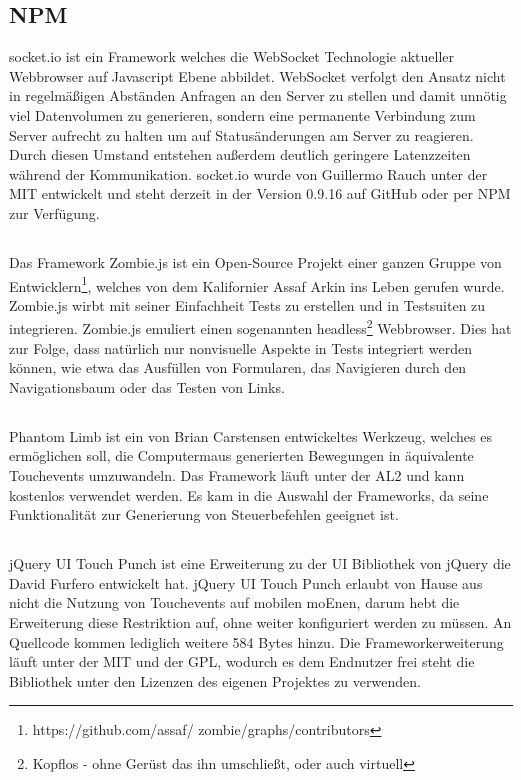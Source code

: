 	\subsection{NPM }
	socket.io ist ein \Gls{Framework} welches die WebSocket Technologie aktueller \Gls{Webbrowser} auf \Gls{Javascript} Ebene abbildet. WebSocket verfolgt den Ansatz nicht in regelmäßigen Abständen Anfragen an den Server zu stellen und damit unnötig viel Datenvolumen zu generieren, sondern eine permanente Verbindung zum Server aufrecht zu halten um auf Statusänderungen am Server zu reagieren. Durch diesen Umstand entstehen außerdem deutlich geringere Latenzzeiten während der Kommunikation. socket.io wurde von Guillermo Rauch unter der \Gls{MIT} entwickelt und steht derzeit in der Version 0.9.16 auf GitHub oder per \Gls{NPM} zur Verfügung.
	
	\subsection{}
	Das \Gls{Framework} Zombie.js ist ein Open-Source Projekt einer ganzen Gruppe von Entwicklern\footnote{https://github.com/assaf/	zombie/graphs/contributors}, welches von dem Kalifornier Assaf Arkin ins Leben gerufen wurde. Zombie.js wirbt mit 	seiner Einfachheit \Gls{Test}s zu erstellen und in \Gls{Test}suiten zu integrieren. Zombie.js emuliert einen sogenannten headless\footnote{Kopflos - ohne Gerüst das ihn umschließt, oder auch virtuell} \Gls{Webbrowser}. Dies hat zur Folge, dass natürlich nur nonvisuelle Aspekte in \Gls{Test}s integriert werden können, wie etwa das Ausfüllen von Formularen, das Navigieren durch den Navigationsbaum oder das Testen von Links.

	\subsection{}
	Phantom Limb ist ein von Brian Carstensen entwickeltes Werkzeug, welches es ermöglichen soll, die \Gls{Computer}maus generierten Bewegungen in äquivalente \mbox{Touchevents} umzuwandeln. Das \Gls{Framework} läuft unter der \Gls{AL2} und kann kostenlos 	verwendet werden. Es kam in die Auswahl der \Gls{Framework}s, da seine Funktionalität zur Generierung von Steuerbefehlen geeignet ist.
	
	\subsection{}
	jQuery UI Touch Punch ist eine Erweiterung zu der UI Bibliothek von jQuery die David Furfero entwickelt hat. jQuery UI Touch Punch erlaubt von Hause aus nicht die Nutzung von Touchevents auf mobilen \Gls{moEn}en, darum hebt die Erweiterung diese Restriktion auf, ohne weiter konfiguriert werden zu müssen. An Quellcode kommen lediglich weitere 584 Bytes hinzu. Die \Gls{Framework}erweiterung läuft unter der MIT und der \Gls{GPL}, wodurch es dem Endnutzer frei steht die Bibliothek unter den Lizenzen des eigenen Projektes zu verwenden.
	
